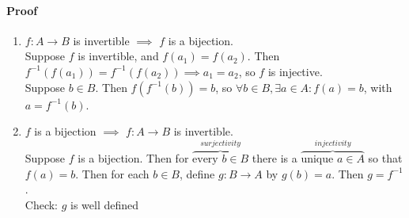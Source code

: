 \documentclass{article}
\newcommand{\mapab}[2]{{#1}\xrightarrow{}{#2}}
\begin{document}
	\paragraph{Proof}
	\begin{enumerate}[label=(\roman*)]
		\item $f:\mapab{A}{B}$ is invertible $\implies$ $f$ is a bijection.\\
		Suppose $f$ is invertible, and $f(a_1)=f(a_2)$. Then $f^{-1}(f(a_1))=f^{-1}(f(a_2))\implies a_1=a_2$, so $f$ is injective.\\
		Suppose $b\in B$. Then $f(f^{-1}(b)) = b$, so $\forall b\in B, \exists a\in A : f(a) = b$, with $a = f^{-1}(b)$.\\
		\item $f$ is a bijection $\implies$ $f:\mapab{A}{B}$ is invertible.\\
		Suppose $f$ is a bijection. Then for $\overbrace{\textrm{every }b\in B}^{surjectivity}$ there is a $\overbrace{\textrm{unique } a\in A}^{injectivity}$ so that $f(a) = b$. Then for each $b\in B$, define $g:\mapab{B}{A}$ by $g(b) = a$. Then $g=f^{-1}$.\\
		Check: $g$ is well defined
	\end{enumerate}
\end{document}
